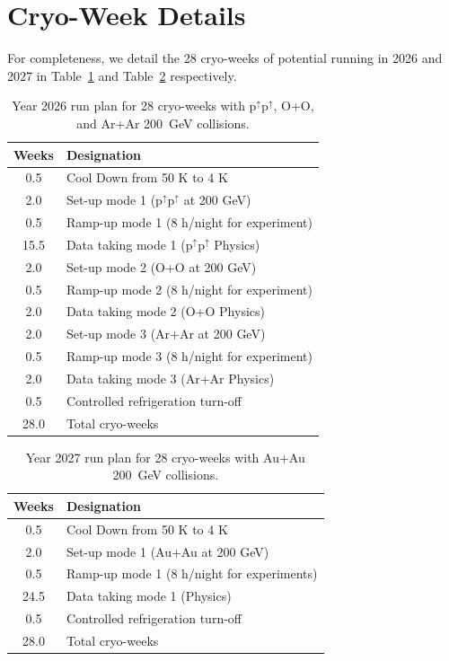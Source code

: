 \FloatBarrier

\newpage
\section{Cryo-Week Details}
\label{sec:cryo20262027}

For completeness, we detail the 28 cryo-weeks of potential running in 2026 and 2027 in Table~\ref{tab:cryoplan2026} and Table~\ref{tab:cryoplan2027} respectively.

\begin{table}[hb!]
\centering
\begin{tabular}{ | c | l | }
\hline
Weeks & Designation \\ \hline
0.5  & Cool Down from 50 K to 4 K \\ \hline
2.0  & Set-up mode 1 (p$^{\uparrow}$p$^{\uparrow}$ at 200 GeV) \\ \hline
0.5  & Ramp-up mode 1 (8 h/night for experiment) \\ \hline
15.5 & Data taking mode 1 (p$^{\uparrow}$p$^{\uparrow}$ Physics) \\ \hline
2.0  & Set-up mode 2 (O+O at 200 GeV) \\ \hline
0.5  & Ramp-up mode 2 (8 h/night for experiment) \\ \hline
2.0 & Data taking mode 2 (O+O Physics) \\ \hline
2.0  & Set-up mode 3 (Ar+Ar at 200 GeV) \\ \hline
0.5  & Ramp-up mode 3 (8 h/night for experiment) \\ \hline
2.0 & Data taking mode 3 (Ar+Ar Physics) \\ \hline
0.5  & Controlled refrigeration turn-off \\ \hline \hline \hline
28.0 & Total cryo-weeks \\
\hline
\end{tabular}
\caption{Year 2026 run plan for 28 cryo-weeks with p$^{\uparrow}$p$^{\uparrow}$, O+O, and Ar+Ar 200~GeV collisions.\label{tab:cryoplan2026}}
\end{table}


\begin{table}
\centering
\begin{tabular}{ | c | l | }
\hline
Weeks & Designation \\ \hline
0.5  & Cool Down from 50 K to 4 K \\ \hline
2.0  & Set-up mode 1 (Au+Au at 200 GeV) \\ \hline
0.5  & Ramp-up mode 1 (8 h/night for experiments) \\ \hline
24.5 & Data taking mode 1 (Physics) \\ \hline
0.5  & Controlled refrigeration turn-off \\ \hline \hline \hline
28.0 & Total cryo-weeks \\
\hline
\end{tabular}
\caption{Year 2027 run plan for 28 cryo-weeks with Au+Au 200~GeV collisions.
\label{tab:cryoplan2027}}
\end{table}